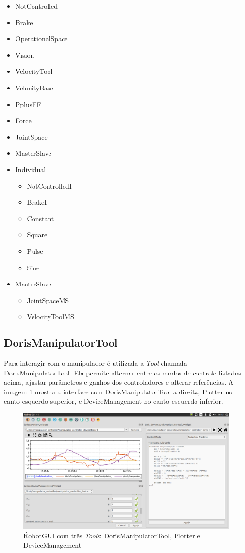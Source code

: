 \begin{itemize}
\item NotControlled
\item Brake
\item OperationalSpace
\item Vision
\item VelocityTool
\item VelocityBase
\item PplusFF
\item Force
\item JointSpace
\item MasterSlave
\item Individual
	\begin{itemize}
	\item NotControlledI
	\item BrakeI
	\item Constant
	\item Square
	\item Pulse
	\item Sine
	\end{itemize}
\item MasterSlave
	\begin{itemize}
	\item JointSpaceMS
	\item VelocityToolMS
	\end{itemize}
\end{itemize}

\subsection{DorisManipulatorTool}
Para interagir com o manipulador é utilizada a \textit{Tool} chamada DorisManipulatorTool. Ela permite alternar entre os modos de controle listados acima, ajustar parâmetros e ganhos dos controladores e alterar referências. A imagem \ref{fig:screenshot1} mostra a interface com DorisManipulatorTool a direita,  Plotter no canto esquerdo superior, e DeviceManagement no canto esquerdo inferior.
 
\begin{figure}[!h]
  \centering
  \includegraphics[width=\linewidth]{./img/screenshot/sc1.png}
  \caption{ŔobotGUI com três \textit{Tools}: DorisManipulatorTool, Plotter e DeviceManagement}
  \label{fig:screenshot1}
\end{figure}


